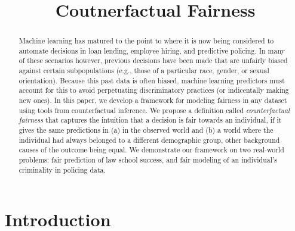 \documentclass{article}
\title{Coutnerfactual Fairness}
\begin{document}
\maketitle




\begin{abstract} 
  Machine learning has matured to the point to where it is now being considered to
  automate decisions in loan lending, employee hiring, and predictive policing.
  In many of these scenarios however, previous decisions have been made that are unfairly biased
  against certain subpopulations (e.g., those of a particular race,
  gender, or sexual orientation).  Because this past data is often
  biased, machine learning predictors must account for this to avoid perpetuating
  discriminatory practices (or indicentally making new ones).  In this paper, we develop a
  framework for modeling fairness in any dataset using tools from
  counterfactual inference. We propose a definition called
  \emph{counterfactual fairness} that captures the intuition
  that a decision is fair towards an individual, if it gives the same
  predictions in (a) in the observed world and (b) a world where the
  individual had always belonged to a different demographic group,
  other background causes of the outcome being equal. We demonstrate 
  our framework on two real-world problems: fair
  prediction of law school success, and fair modeling of an
  individual's criminality in policing data.
\end{abstract} 

\section{Introduction}
\label{introduction}

\end{document}
